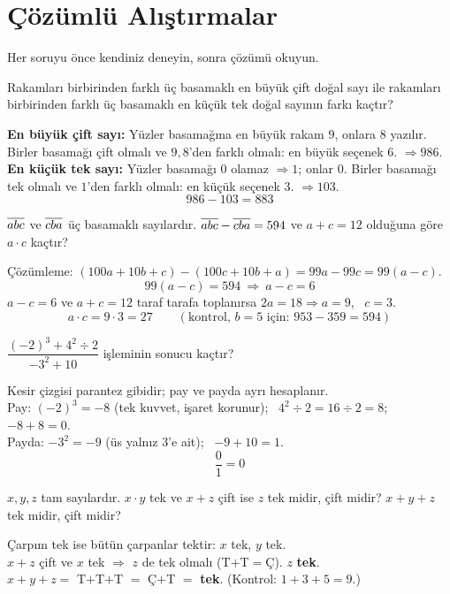 \section{Çözümlü Alıştırmalar}
Her soruyu önce kendiniz deneyin, sonra çözümü okuyun.

\begin{alistirma}
Rakamları birbirinden farklı üç basamaklı en büyük çift doğal sayı ile rakamları birbirinden farklı üç basamaklı en küçük tek doğal sayının farkı kaçtır?
\end{alistirma}
\begin{cozum}
\textbf{En büyük çift sayı:} Yüzler basamağına en büyük rakam \(9\), onlara \(8\) yazılır. Birler basamağı çift olmalı ve \(9,8\)'den farklı olmalı: en büyük seçenek \(6\). \(\Rightarrow 986\).\\
\textbf{En küçük tek sayı:} Yüzler basamağı \(0\) olamaz \(\Rightarrow 1\); onlar \(0\). Birler basamağı tek olmalı ve \(1\)'den farklı olmalı: en küçük seçenek \(3\). \(\Rightarrow 103\).
\[986-103=883\]
\end{cozum}

\begin{alistirma}
\(\overline{abc}\) ve \(\overline{cba}\) üç basamaklı sayılardır. \(\overline{abc}-\overline{cba}=594\) ve \(a+c=12\) olduğuna göre \(a\cdot c\) kaçtır?
\end{alistirma}
\begin{cozum}
Çözümleme: \((100a+10b+c)-(100c+10b+a)=99a-99c=99(a-c)\).
\[99(a-c)=594\ \Rightarrow\ a-c=6\]
\(a-c=6\) ve \(a+c=12\) taraf tarafa toplanırsa \(2a=18\Rightarrow a=9\), \ \(c=3\).
\[a\cdot c=9\cdot 3=27\qquad(\text{kontrol, } b=5 \text{ için: } 953-359=594)\]
\end{cozum}

\begin{alistirma}
\(\dfrac{(-2)^3+4^2\div 2}{-3^2+10}\) işleminin sonucu kaçtır?
\end{alistirma}
\begin{cozum}
Kesir çizgisi parantez gibidir; pay ve payda ayrı hesaplanır.\\
Pay: \((-2)^3=-8\) (tek kuvvet, işaret korunur); \ \(4^2\div 2=16\div 2=8\); \ \(-8+8=0\).\\
Payda: \(-3^2=-9\) (üs yalnız \(3\)'e ait); \ \(-9+10=1\).
\[\frac{0}{1}=0\]
\end{cozum}

\begin{alistirma}
\(x,y,z\) tam sayılardır. \(x\cdot y\) tek ve \(x+z\) çift ise \(z\) tek midir, çift midir? \(x+y+z\) tek midir, çift midir?
\end{alistirma}
\begin{cozum}
Çarpım tek ise bütün çarpanlar tektir: \(x\) tek, \(y\) tek.\\
\(x+z\) çift ve \(x\) tek \(\Rightarrow\) \(z\) de tek olmalı (T\(+\)T\(=\)Ç). \quad \(z\) \textbf{tek}.\\
\(x+y+z=\) T\(+\)T\(+\)T \(=\) Ç\(+\)T \(=\) \textbf{tek}. \quad (Kontrol: \(1+3+5=9\).)
\end{cozum}

